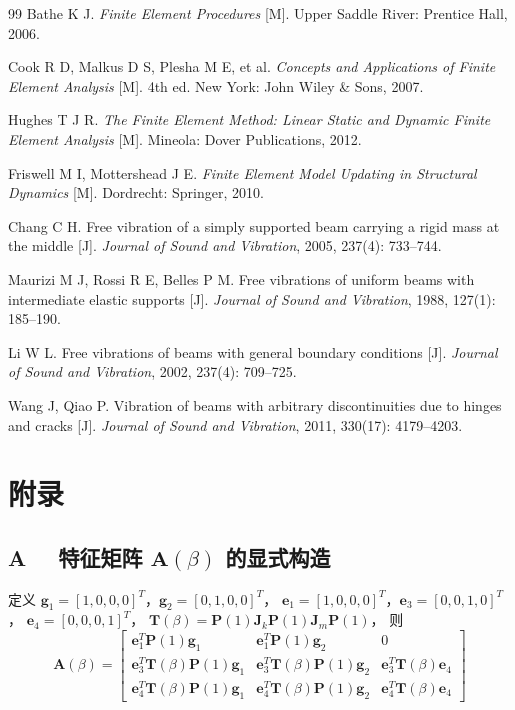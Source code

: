 \documentclass[twoside,12pt]{ctexart}
\begin{document}
\begin{thebibliography}{99}
Bathe K J. \textit{Finite Element Procedures} [M].
Upper Saddle River: Prentice Hall, 2006.

Cook R D, Malkus D S, Plesha M E, et al.
\textit{Concepts and Applications of Finite Element Analysis} [M].
4th ed. New York: John Wiley \& Sons, 2007.

Hughes T J R. \textit{The Finite Element Method: Linear Static and Dynamic
Finite Element Analysis} [M]. Mineola: Dover Publications, 2012.

Friswell M I, Mottershead J E. \textit{Finite Element Model Updating in
Structural Dynamics} [M]. Dordrecht: Springer, 2010.

Chang C H. Free vibration of a simply supported beam carrying a rigid mass
at the middle [J]. \textit{Journal of Sound and Vibration},
2005, 237(4): 733--744.

Maurizi M J, Rossi R E, Belles P M. Free vibrations of uniform beams with
intermediate elastic supports [J]. \textit{Journal of Sound and Vibration},
1988, 127(1): 185--190.

Li W L. Free vibrations of beams with general boundary conditions [J].
\textit{Journal of Sound and Vibration}, 2002, 237(4): 709--725.

Wang J, Qiao P. Vibration of beams with arbitrary discontinuities due to
hinges and cracks [J]. \textit{Journal of Sound and Vibration},
2011, 330(17): 4179--4203.

\end{thebibliography}

\newpage
\section*{附\;录}

\subsection*{A \ \ 特征矩阵 $\mathbf{A}(\beta)$ 的显式构造}

定义 $\mathbf{g}_1=[1,0,0,0]^T$，$\mathbf{g}_2=[0,1,0,0]^T$，
$\mathbf{e}_1=[1,0,0,0]^T$，$\mathbf{e}_3=[0,0,1,0]^T$，
$\mathbf{e}_4=[0,0,0,1]^T$，
$\mathbf{T}(\beta)=\mathbf{P}(1)\mathbf{J}_k\mathbf{P}(1)\mathbf{J}_m\mathbf{P}(1)$，
则
\begin{equation*}
  \mathbf{A}(\beta)=\begin{bmatrix}
    \mathbf{e}_1^T\mathbf{P}(1)\mathbf{g}_1 &
    \mathbf{e}_1^T\mathbf{P}(1)\mathbf{g}_2 & 0 \\[4pt]
    \mathbf{e}_3^T\mathbf{T}(\beta)\mathbf{P}(1)\mathbf{g}_1 &
    \mathbf{e}_3^T\mathbf{T}(\beta)\mathbf{P}(1)\mathbf{g}_2 &
    \mathbf{e}_3^T\mathbf{T}(\beta)\mathbf{e}_4 \\[4pt]
    \mathbf{e}_4^T\mathbf{T}(\beta)\mathbf{P}(1)\mathbf{g}_1 &
    \mathbf{e}_4^T\mathbf{T}(\beta)\mathbf{P}(1)\mathbf{g}_2 &
    \mathbf{e}_4^T\mathbf{T}(\beta)\mathbf{e}_4
  \end{bmatrix}
\end{equation*}
\end{document}
